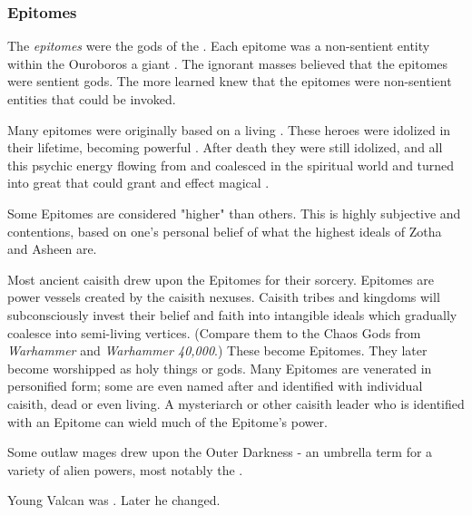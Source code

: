 \subsubsection{Epitomes}
%
The \emph{epitomes} were the gods of the \caisith.
Each epitome was a non-sentient entity within the Ouroboros \nexus\dash a giant \daemon. 
The ignorant masses believed that the epitomes were sentient gods.
The more learned knew that the epitomes were non-sentient entities that could be invoked. 

Many epitomes were originally based on a living \caisith. 
These heroes were idolized in their lifetime, becoming powerful . 
After death they were still idolized, and all this psychic energy flowing from  and  coalesced in the spiritual world and turned into great \daemons that could grant  and effect magical . 

Some Epitomes are considered "higher" than others. This is highly subjective and contentions, based on one's personal belief of what the highest ideals of Zotha and Asheen are. 

Most ancient caisith drew upon the Epitomes for their sorcery. Epitomes are power vessels created by the caisith nexuses. Caisith tribes and kingdoms will subconsciously invest their belief and faith into intangible ideals which gradually coalesce into semi-living vertices. (Compare them to the Chaos Gods from \emph{Warhammer} and \emph{Warhammer 40,000}.) These become Epitomes. They later become worshipped as holy things or gods. Many Epitomes are venerated in personified form; some are even named after and identified with individual caisith, dead or even living. A mysteriarch or other caisith leader who is identified with an Epitome can wield much of the Epitome’s power. 

Some outlaw mages drew upon the Outer Darkness - an umbrella term for a variety of alien powers, most notably the \xzaishanns. 

Young Valcan was . Later he changed.





